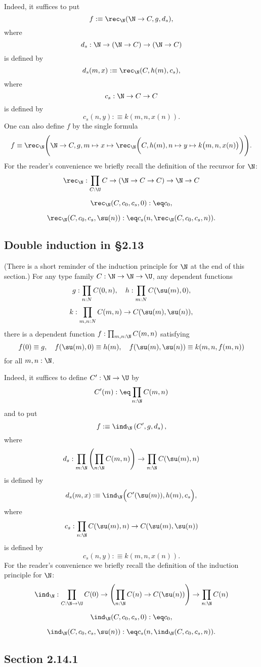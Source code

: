 \documentclass[12pt]{article}
\begin{document}
Indeed, it suffices to put 
$$
f:\equiv\rec_\N(\N\to C,g,d_s),
$$ 
where 
$$
d_s:\N\to(\N\to C)\to(\N\to C)
$$ 
is defined by 
$$
d_s(m,x):\equiv\rec_\N(C,h(m),c_s),
$$ 
where 
$$
c_s:\N\to C\to C
$$ 
is defined by 
$$
c_s(n,y):\equiv k(m,n,x(n)).
$$ 
One can also define $f$ by the single formula
$$
f\equiv\rec_\N\Bigg(\N\to C,g,m\mapsto x\mapsto\rec_\N\bigg(C,h(m),n\mapsto y\mapsto k\big(m,n,x(n)\big)\bigg)\Bigg).
$$ 
For the reader's convenience we briefly recall the definition of the recursor for $\N$:
$$\rec_\N:\prod_{C:\U}C\to(\N\to C\to C)\to\N\to C$$

$$\rec_\N(C,c_0,c_s,0):\eq c_0,$$

$$\rec_\N(C,c_0,c_s,\su(n)):\eq c_s(n,\rec_\N(C,c_0,c_s,n)).$$


\subsection{Double induction in \S2.13}

(There is a short reminder of the induction principle for $\N$ at the end of this section.) For any type family $C:\N\to\N\to\U$, any dependent functions
$$
g:\prod_{n:N}C(0,n),\quad h:\prod_{m:N}C(\su(m),0),
$$
$$
k:\prod_{m,n:N}C(m,n)\to C(\su(m),\su(n)),
$$ 
there is a dependent function $f:\prod_{m,n:\N}C(m,n)$ satisfying 
$$
f(0)\equiv g,\quad f(\su(m),0)\equiv h(m),\quad f(\su(m),\su(n))\equiv k(m,n,f(m,n))
$$ 
for all $m,n:\N$.

Indeed, it suffices to define $C':\N\to\U$ by 
$$
C'(m):\eq\prod_{n:\N}C(m,n)
$$ 
and to put 
$$
f:\equiv\ind_\N\left(C',g,d_s\right),
$$ 
where 
$$
d_s:\prod_{m:\N}\left(\prod_{n:\N}C(m,n)\right)\to\prod_{n:\N}C(\su(m),n)
$$ 
is defined by 
$$
d_s(m,x):\equiv\ind_\N\Big(C'(\su(m)),h(m),c_s\Big),
$$ 
where 
$$
c_s:\prod_{n:\N}C(\su(m),n)\to C(\su(m),\su(n))
$$ 
is defined by 
$$
c_s(n,y):\equiv k(m,n,x(n)).
$$ 
For the reader's convenience we briefly recall the definition of the induction principle for $\N$:
$$\ind_\N:\prod_{C:\N\to\U}C(0)\to\left(\prod_{n:\N}C(n)\to C(\su(n))\right)\to\prod_{n:\N} C(n)$$

$$\ind_\N(C,c_0,c_s,0):\eq c_0,$$

$$\ind_\N(C,c_0,c_s,\su(n)):\eq c_s(n,\ind_\N(C,c_0,c_s,n)).$$


\subsection{Section 2.14.1}
\end{document}
